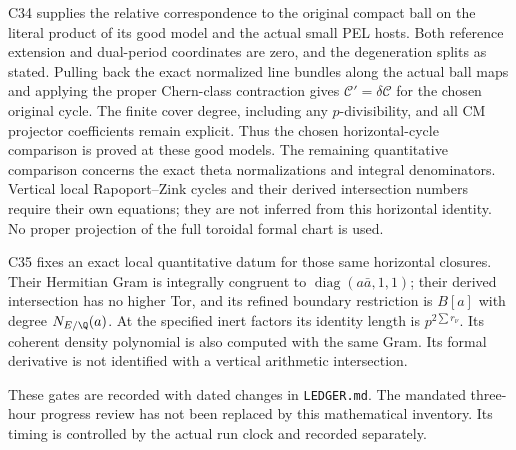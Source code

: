C34 supplies the relative correspondence to the original compact
ball on the literal product of its good model and the actual
small PEL hosts. Both reference extension and dual-period
coordinates are zero, and the degeneration splits as stated.
Pulling back the exact normalized line bundles along the actual
ball maps and applying the proper Chern-class contraction gives
$\mathcal C'=\delta\mathcal C$ for the chosen original cycle.
The finite cover degree, including any $p$-divisibility, and all
CM projector coefficients remain explicit. Thus the chosen
horizontal-cycle comparison is proved at these good models.
The remaining quantitative comparison concerns the exact theta
normalizations and integral denominators. Vertical local
Rapoport--Zink cycles and their derived intersection numbers
require their own equations; they are not inferred from this
horizontal identity. No proper projection of the full toroidal
formal chart is used.

C35 fixes an exact local quantitative datum for those same
horizontal closures. Their Hermitian Gram is integrally
congruent to $\operatorname{diag}(a\bar a,1,1)$; their derived
intersection has no higher Tor, and its refined boundary
restriction is $B[a]$ with degree $N_{E/\Q}(a)$.
At the specified inert factors its identity length is
$p^{2\sum r_\nu}$. Its coherent density polynomial is also
computed with the same Gram. Its formal derivative is not
identified with a vertical arithmetic intersection.

These gates are recorded with dated changes in \texttt{LEDGER.md}.
The mandated three-hour progress review has not been replaced by
this mathematical inventory. Its timing is controlled by the actual
run clock and recorded separately.
